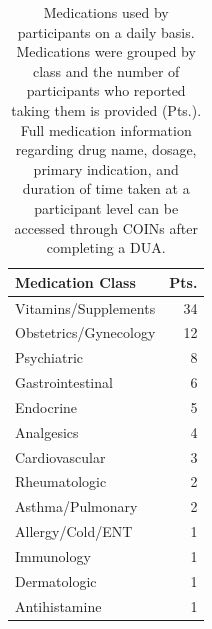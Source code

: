 \begin{table}[!ht]
\caption{Medications used by participants on a daily basis. Medications were grouped by class and the number of participants who reported taking them is provided (Pts.). Full medication information regarding drug name, dosage, primary indication, and duration of time taken at a participant level can be accessed through COINs after completing a DUA.}
\centering
\begin{tabular}{lr}
\textbf{Medication Class} & \textbf{Pts.} \\
\hline    
Vitamins/Supplements & 34 \\
Obstetrics/Gynecology & 12 \\
Psychiatric & 8 \\
Gastrointestinal & 6 \\
Endocrine & 5 \\
Analgesics  & 4 \\
Cardiovascular & 3 \\
Rheumatologic & 2 \\
Asthma/Pulmonary & 2 \\
Allergy/Cold/ENT & 1 \\
Immunology & 1 \\
Dermatologic & 1 \\
Antihistamine & 1 \\
\end{tabular}
\label{table:med} 
\end{table}


